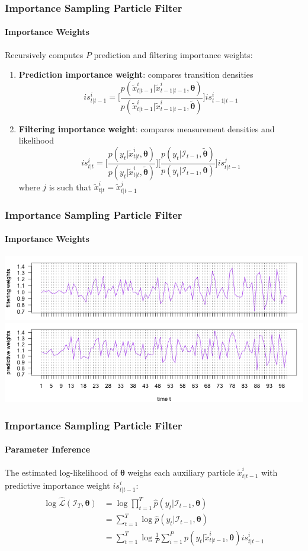 \documentclass[11pt]{beamer}
\begin{document}
\begin{frame}
\frametitle{Importance Sampling Particle Filter}
\framesubtitle{Importance Weights}
Recursively computes $P$ prediction and filtering importance weights:
\begin{enumerate}
	\item \textbf{Prediction importance weight}: compares transition densities
	$$
	is_{t|t-1}^i = \bigg[ \frac{p(\tilde{x}_{t|t-1}^i | \tilde{x}_{t-1|t-1}^i, \boldsymbol{\theta})}{p(\tilde{x}_{t|t-1}^i | \tilde{x}_{t-1|t-1}^i, \boldsymbol{\tilde{\theta}})} \bigg] is_{t-1|t-1}^i	
	$$  
	\item \textbf{Filtering importance weight}: compares measurement densities and likelihood	
	$$
	is_{t|t}^i = \bigg[ \frac{p(y_t | \tilde{x}_{t|t}^i, \boldsymbol{\theta})}{p(y_t | \tilde{x}_{t|t}^i, \boldsymbol{\tilde{\theta}})} \bigg] \bigg[ \frac{p(y_t | \mathcal{I}_{t-1}, \boldsymbol{\tilde{\theta}})}{p(y_t | \mathcal{I}_{t-1}, \boldsymbol{\theta})} \bigg] is_{t|t-1}^j		
	$$ 
	where $j$ is such that $\tilde{x}_{t|t}^i = \tilde{x}_{t|t-1}^j$
\end{enumerate}
\end{frame}

\begin{frame}
\frametitle{Importance Sampling Particle Filter}
\framesubtitle{Importance Weights}
\centering
\includegraphics[scale=0.45]{ullm_is_filt_weights_P200}\\
\includegraphics[scale=0.45]{ullm_is_pred_weights_P200}
\end{frame}

\begin{frame}
\frametitle{Importance Sampling Particle Filter}
\framesubtitle{Parameter Inference}
The estimated log-likelihood of $\boldsymbol{\theta}$ weighs each auxiliary particle $\tilde{x}_{t|t-1}^i$ with predictive importance weight $is_{t|t-1}^i$: 
\begin{align*} 
\begin{split}
\log \hat{\mathcal{L}}(\mathcal{I}_T, \boldsymbol{\theta}) &= \log \prod_{t=1}^T \hat{p}(y_t | \mathcal{I}_{t-1}, \boldsymbol{\theta}) \\
&= \sum_{t=1}^T \log \hat{p}(y_t | \mathcal{I}_{t-1}, \boldsymbol{\theta}) \\
&= \sum_{t=1}^T \log \frac{1}{P} \sum_{i=1}^P p(y_t | \tilde{x}_{t|t-1}^i, \boldsymbol{\theta}) is_{t|t-1}^i \\
\end{split}					
\end{align*} 
\end{frame}
\end{document}
